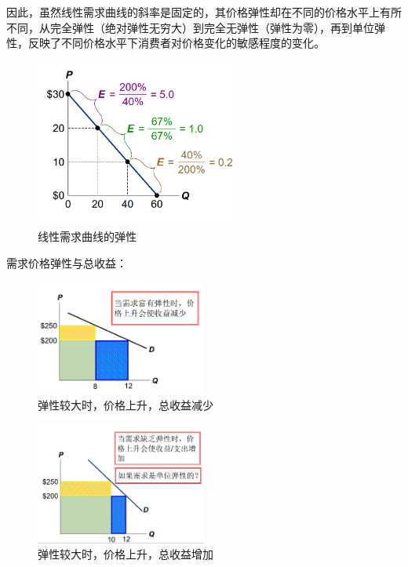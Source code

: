 \documentclass[12pt,a4paper]{article}
\begin{document}
因此，虽然线性需求曲线的斜率是固定的，其价格弹性却在不同的价格水平上有所不同，从完全弹性（绝对弹性无穷大）到完全无弹性（弹性为零），再到单位弹性，反映了不同价格水平下消费者对价格变化的敏感程度的变化。

\begin{figure}[H] 
  \centering %
  \includegraphics[width=0.6\textwidth]{线性需求曲线的弹性.png} %
  \caption{线性需求曲线的弹性} %
\end{figure}

需求价格弹性与总收益：\\
\begin{figure}[H] 
  \centering %
  \includegraphics[width=0.5\textwidth]{弹性较大时的总收益变化.png} %
  \caption{弹性较大时，价格上升，总收益减少} %
\end{figure}
\begin{figure}[H] 
  \centering %
  \includegraphics[width=0.5\textwidth]{弹性较小时的总收益变化.png} %
  \caption{弹性较大时，价格上升，总收益增加} %
\end{figure}
\end{document}
